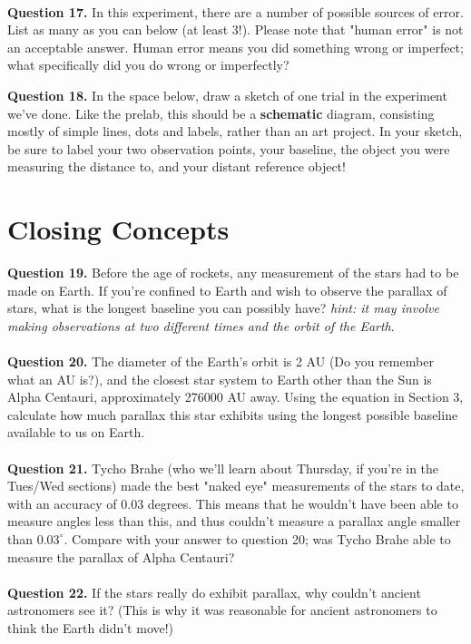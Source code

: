 \documentclass[11pt]{article}
\begin{document}
\vspace{1.5cm}
 \hrulefill\\

\textbf{Question 17.} In this experiment, there are a number of possible sources of error. List as many as you can below (at least 3!). Please note that "human error" is not an acceptable answer. Human error means you did something wrong or imperfect; what specifically did you do wrong or imperfectly?\\

\vspace{4.5cm}
\hrulefill

\newpage

\textbf{Question 18.} In the space below, draw a sketch of one trial in the experiment we've done. Like the prelab, this should be a \textbf{schematic} diagram, consisting mostly of simple lines, dots and labels, rather than an art project. In your sketch, be sure to label your two observation points, your baseline, the object you were measuring the distance to, and your distant reference object!

\newpage

\section{Closing Concepts}
\textbf{Question 19.} Before the age of rockets, any measurement of the stars had to be made on Earth. If you're confined to Earth and wish to observe the parallax of stars, what is the longest baseline you can possibly have? \textit{hint: it may involve making observations at two different times and the orbit of the Earth}.\\

\vspace{1.5cm}
\hrulefill\\

\textbf{Question 20.} The diameter of the Earth's orbit is 2 AU (Do you remember what an AU is?), and the closest star system to Earth other than the Sun is Alpha Centauri, approximately 276000 AU away. Using the equation in Section 3, calculate how much parallax this star exhibits using the longest possible baseline available to us on Earth.\\

\vspace{1.5cm}
\hrulefill\\

\textbf{Question 21.} Tycho Brahe (who we'll learn about Thursday, if you're in the Tues/Wed sections) made the best "naked eye" measurements of the stars to date, with an accuracy of 0.03 degrees. This means that he wouldn't have been able to measure angles less than this, and thus couldn't measure a parallax angle smaller than $0.03^\circ$. Compare with your answer to question 20; was Tycho Brahe able to measure the parallax of Alpha Centauri?\\

\vspace{1.5cm}
\hrulefill\\

\textbf{Question 22.} If the stars really do exhibit parallax, why couldn't ancient astronomers see it? (This is why it  was reasonable for ancient astronomers to think the Earth didn't move!)\\

\vspace{1.5cm}
\hrulefill\\
\end{document}

